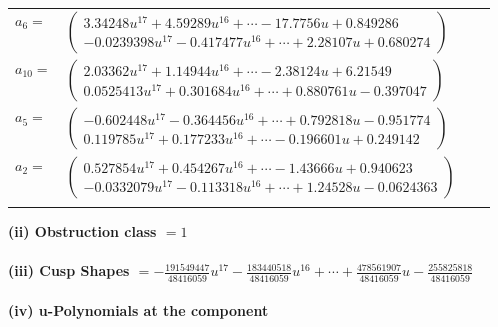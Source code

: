 \documentclass[1p]{elsarticle_modified}
\theoremstyle{definition}
\begin{document}
\begin{tabular}{m{7pt} m{180pt} m{7pt} m{180pt} }
\flushright $a_{6}=$&$\begin{pmatrix}3.34248 u^{17}+4.59289 u^{16}+\cdots-17.7756 u+0.849286\\-0.0239398 u^{17}-0.417477 u^{16}+\cdots+2.28107 u+0.680274\end{pmatrix}$ \\
\flushright $a_{10}=$&$\begin{pmatrix}2.03362 u^{17}+1.14944 u^{16}+\cdots-2.38124 u+6.21549\\0.0525413 u^{17}+0.301684 u^{16}+\cdots+0.880761 u-0.397047\end{pmatrix}$ \\
\flushright $a_{5}=$&$\begin{pmatrix}-0.602448 u^{17}-0.364456 u^{16}+\cdots+0.792818 u-0.951774\\0.119785 u^{17}+0.177233 u^{16}+\cdots-0.196601 u+0.249142\end{pmatrix}$ \\
\flushright $a_{2}=$&$\begin{pmatrix}0.527854 u^{17}+0.454267 u^{16}+\cdots-1.43666 u+0.940623\\-0.0332079 u^{17}-0.113318 u^{16}+\cdots+1.24528 u-0.0624363\end{pmatrix}$\\&\end{tabular}
\flushleft \textbf{(ii) Obstruction class $= 1$}\\~\\
\flushleft \textbf{(iii) Cusp Shapes $= -\frac{191549447}{48416059} u^{17}-\frac{183440518}{48416059} u^{16}+\cdots+\frac{478561907}{48416059} u-\frac{255825818}{48416059}$}\\~\\
\newpage\renewcommand{\arraystretch}{1}
\flushleft \textbf{(iv) u-Polynomials at the component}\newline \\
\end{document}
